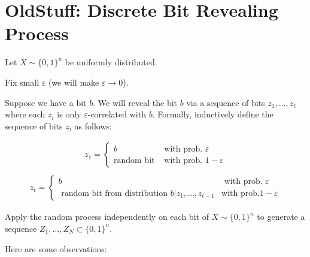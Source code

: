 \documentclass
[12pt,letterpaper]
{article}
\theoremstyle{definition}
\theoremstyle{remark}
\let\epsilon=\varepsilon
\numberwithin{equation}{section}
\begin{document}
\iffalse
\newpage


\newpage  
\section{OldStuff: Discrete Bit Revealing Process}  

Let $X \sim \{0,1\}^n$ be uniformly distributed.

Fix small $\epsilon$ (we will make $\epsilon \to 0$).

Suppose we have a bit $b$.  We will reveal the bit $b$ via a sequence of bits $z_1,\ldots,z_
\ell$ where each $z_i$ is only $\epsilon$-correlated with $b$.  Formally, inductively define the sequence of bits $z_i$ as follows:

\begin{align}
    z_1 = \begin{cases}
            b & \text{ with prob. } \epsilon \\
            \text{random bit} & \text{ with prob. } 1-\epsilon 
        \end{cases} \\
        \end{align}
        \begin{align}
    z_t = \begin{cases}
        b & \text{ with prob. } \epsilon\\ 
        \text{ random bit from distribution } b | z_1,\ldots, z_{t-1} & \text{with prob.} 1-\epsilon 
        \end{cases}
\end{align}

Apply the random process independently on each bit of $X \sim \{0,1\}^n$ to generate a sequence  $Z_1,\ldots, Z_N \subset \{0,1\}^n$.

Here are some observations:
\end{document}
